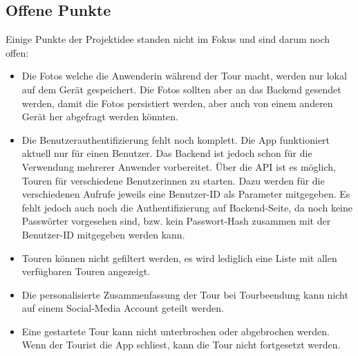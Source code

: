 \subsection{Offene Punkte}\label{offenePunkte}
Einige Punkte der Projektidee standen nicht im Fokus und sind darum noch offen:

\begin{itemize}
  \item Die Fotos welche die Anwenderin während der Tour macht, werden nur lokal auf dem Gerät gespeichert. Die Fotos sollten aber an das Backend gesendet werden, damit die Fotos persistiert werden, aber auch von einem anderen Gerät her abgefragt werden könnten.
  \item Die Benutzerauthentifizierung fehlt noch komplett. Die App funktioniert aktuell nur für einen Benutzer. Das Backend ist jedoch schon für die Verwendung mehrerer Anwender vorbereitet. Über die API ist es möglich, Touren für verschiedene Benutzerinnen zu starten. Dazu werden für die verschiedenen Aufrufe jeweils eine Benutzer-ID als Parameter mitgegeben. Es fehlt jedoch auch noch die Authentifizierung auf Backend-Seite, da noch keine Passwörter vorgesehen sind, bzw. kein Passwort-Hash zusammen mit der Benutzer-ID mitgegeben werden kann.
  \item Touren können nicht gefiltert werden, es wird lediglich eine Liste mit allen verfügbaren Touren angezeigt.
  \item Die personalisierte Zusammenfassung der Tour bei Tourbeendung kann nicht auf einem Social-Media Account geteilt werden.
  \item Eine gestartete Tour kann nicht unterbrochen oder abgebrochen werden. Wenn der Tourist die App schliest, kann die Tour nicht fortgesetzt werden.
\end{itemize}


